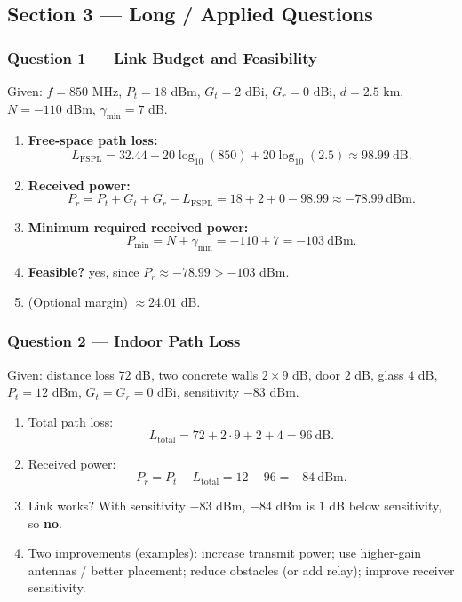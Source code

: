 \documentclass[11pt,a4paper]{article}
\begin{document}
\subsection*{Section 3 --- Long / Applied Questions}

\subsubsection*{Question 1 --- Link Budget and Feasibility}
Given: $f=850$ MHz, $P_t=18$ dBm, $G_t=2$ dBi, $G_r=0$ dBi, $d=2.5$ km, $N=-110$ dBm, $\gamma_{\min}=7$ dB.

\begin{enumerate}[label=\alph*.]
    \item \textbf{Free-space path loss:}
    \[
    L_{\mathrm{FSPL}}=32.44+20\log_{10}(850)+20\log_{10}(2.5)\approx 98.99\ \mathrm{dB}.
    \]
    \item \textbf{Received power:}
    \[
    P_r=P_t+G_t+G_r-L_{\mathrm{FSPL}}=18+2+0-98.99\approx -78.99\ \mathrm{dBm}.
    \]
    \item \textbf{Minimum required received power:}
    \[
    P_{\min}=N+\gamma_{\min}=-110+7=-103\ \mathrm{dBm}.
    \]
    \item \textbf{Feasible?} yes, since $P_r\approx -78.99 > -103$ dBm.
    \item (Optional margin) $\approx 24.01$ dB.
    
\end{enumerate}

\subsubsection*{Question 2 --- Indoor Path Loss}
Given: distance loss $72$ dB, two concrete walls $2\times 9$ dB, door $2$ dB, glass $4$ dB, $P_t=12$ dBm, $G_t=G_r=0$ dBi, sensitivity $-83$ dBm.

\begin{enumerate}[label=\alph*.]
    \item Total path loss:
    \[
    L_{\text{total}}=72+2\cdot 9+2+4=96\ \mathrm{dB}.
    \]
    \item Received power:
    \[
    P_r=P_t-L_{\text{total}}=12-96=-84\ \mathrm{dBm}.
    \]
    \item Link works? With sensitivity $-83$ dBm, $-84$ dBm is $1$ dB below sensitivity, so \textbf{no}.
    \item Two improvements (examples): increase transmit power; use higher-gain antennas / better placement; reduce obstacles (or add relay); improve receiver sensitivity.
\end{enumerate}
\end{document}
